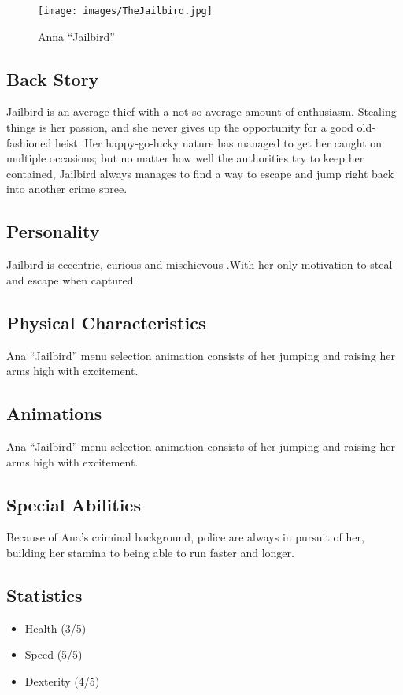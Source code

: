 \documentclass[10pt]{report}
\begin{document}
\begin{multicols}{2}    
    \begin{figure}[H]
        \centering
        \texttt{[image: images/TheJailbird.jpg]}
        \caption{Anna ``Jailbird''}
    \end{figure}

    \subsection{Back Story}
    
    Jailbird is an average thief with a not-so-average amount of enthusiasm. Stealing things is her passion, and she never gives up the opportunity for a good old-fashioned heist. Her happy-go-lucky nature has managed to get her caught on multiple occasions; but no matter how well the authorities try to keep her contained, Jailbird always manages to find a way to escape and jump right back into another crime spree.

    \subsection{Personality}
    
    Jailbird is eccentric, curious and mischievous .With her only motivation to steal and escape when captured.

    \subsection{Physical Characteristics}
    
    Ana “Jailbird” menu selection animation consists of her jumping and raising her arms high with excitement.

    \subsection{Animations}
    
    Ana “Jailbird” menu selection animation consists of her jumping and raising her arms high with excitement.

    \subsection{Special Abilities}
    
    Because of Ana’s criminal background, police are always in pursuit of her, building her stamina to being able to run faster and longer.

    \subsection{Statistics}
    \begin{itemize}
        \item Health (3/5)
        \item Speed (5/5)
        \item Dexterity (4/5)
    \end{itemize}
    
\end{multicols}
\end{document}
